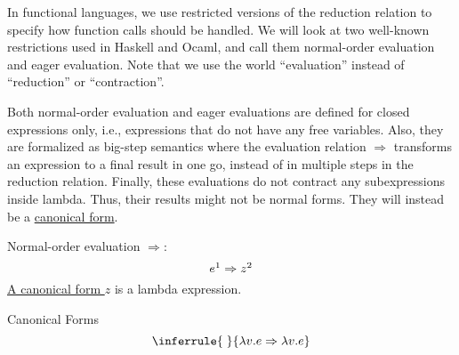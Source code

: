 \begin{enumcirc}
	\item
	In functional languages, we use restricted versions of the reduction relation
	to specify how function calls should be handled.
	We will look at two well-known restrictions used in Haskell and Ocaml, and call
	them normal-order evaluation and eager evaluation.
	Note that we use the world ``evaluation'' instead of ``reduction'' or
	``contraction''.
	\item
	Both normal-order evaluation and eager evaluations are defined for closed
	expressions only, i.e., expressions that do not have any free variables.
	Also, they are formalized as big-step semantics where the evaluation relation
	$\Rightarrow$ transforms an expression to a final result in one go, instead of
	in multiple steps in the reduction relation.
	Finally, these evaluations do not contract any subexpressions inside lambda.
	Thus, their results might not be normal forms.
	They will instead be a \ul{canonical form}.
	\item
	Normal-order evaluation $\Rightarrow$:
	\[
		e\footnotemark \Rightarrow z\footnotemark
	\]
	\ul{A canonical form $z$} is a lambda expression.

	Canonical Forms
	\[
		\inferrule{\;}{\lambda v. e \Rightarrow \lambda v. e}
	\]


\end{enumcirc}
